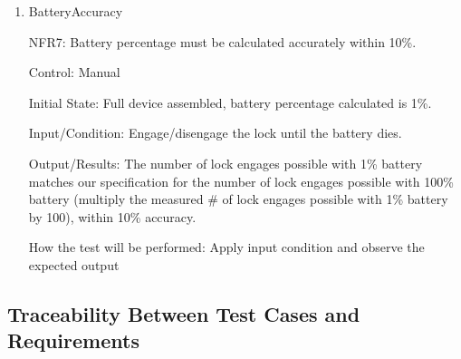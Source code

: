 \documentclass[12pt, titlepage]{article}
\begin{document}
\begin{enumerate}

\item{BatteryAccuracy

NFR7: Battery percentage must be calculated accurately within 10\%. }

Control: Manual

Initial State: Full device assembled, battery percentage calculated is 1\%. 

Input/Condition: Engage/disengage the lock until the battery dies.

Output/Results: The number of lock engages possible with 1\% battery matches our specification for the number of lock engages possible with 100\% battery (multiply the measured \# of lock engages possible with 1\% battery by 100), within 10\% accuracy.

How the test will be performed: Apply input condition and observe the expected output

\end{enumerate}

\subsection{Traceability Between Test Cases and Requirements}
\end{document}
